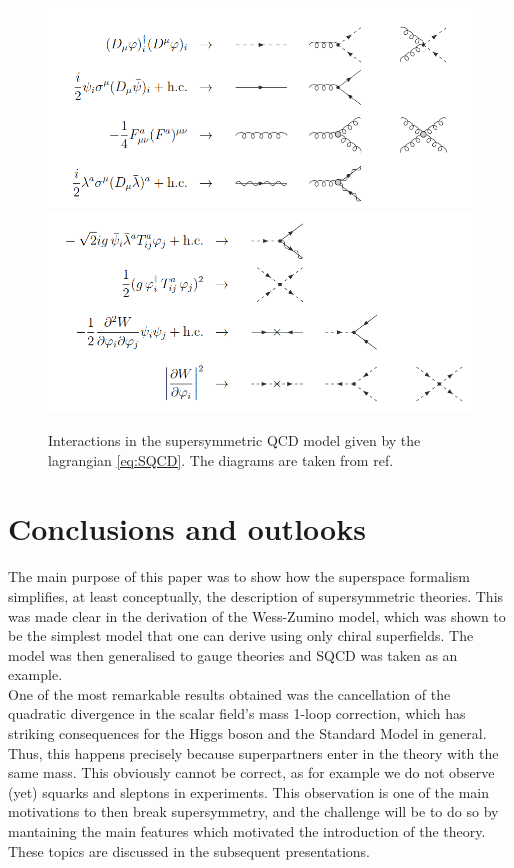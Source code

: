 \documentclass[12pt]{article}
\begin{document}
\begin{figure}[h]
  \centering 
  \includegraphics[scale=0.45]{sqcd_inter_2.png}
  \includegraphics[scale=0.45]{sqcd_inter_1.png}
  \caption{Interactions in the supersymmetric QCD model given by the lagrangian \ref{eq:SQCD}. The diagrams are taken from ref. \cite{Signer_2009}}
  \label{fig:SQCD_interactions}
\end{figure}

\section{Conclusions and outlooks}
The main purpose of this paper was to show how the superspace formalism simplifies, at least conceptually, the description of supersymmetric theories. This was made clear in the derivation 
of the Wess-Zumino model, which was shown to be the simplest model that one can derive using only chiral superfields. The model was then generalised to gauge theories and SQCD was taken as an example. \\
\vspace{5pt}
One of the most remarkable results obtained was the cancellation of the quadratic divergence in the scalar field's mass 1-loop correction, which has striking consequences for the Higgs boson and the Standard Model in general.  
Thus, this happens precisely because superpartners enter in the theory with the same mass. This obviously cannot be correct, as for example we do not observe (yet) squarks and sleptons in experiments. This observation 
is one of the main motivations to then break supersymmetry, and the challenge will be to do so by mantaining the main features which motivated the introduction of the theory. These topics are discussed in the subsequent presentations.

\newpage

\nocite{*}
\printbibliography
\end{document}
